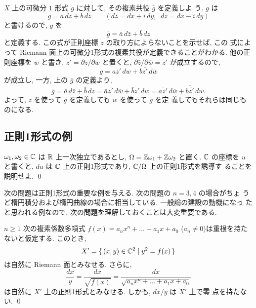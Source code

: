 \documentclass[12pt,twoside]{jarticle}
\def\zbar{{\bar z}}
\def\wbar{{\overline w}}
\def\Z{{\Bbb Z}} %
\def\R{{\Bbb R}} %
\def\C{{\Bbb C}} %
\begin{document}
$X$ 上の可微分 $1$ 形式 $g$ に対して, その複素共役 $\bar g$ を定義しよ
う. $g$ は
\[
  g = a\,dz + b\,d\zbar
  \qquad
  (dz=dx+i\,dy,\;\;d\zbar=dx-i\,dy)
\] %
と書けるので, $\overline{g}$ を %
\[
  \bar g = \bar a \,d\zbar + \bar b \,dz
\]
と定義する. この式が正則座標 $z$ の取り方によらないことを示せば, この
式によって Riemann 面上の可微分1形式の複素共役が定義できることがわかる.
他の正則座標を $w$ と書き, $z'=\partial z/\partial w$ と置くと, %
$\partial\zbar/\partial\wbar= \overline{z'}$ が成立するので, 
\[
  g = a z'\,dw + b \overline{z'}\,d\wbar
\]
が成立し, 一方, 上の $\bar g$ の定義より,
\[
  \bar g
  = \bar a \,d\zbar + \bar b \,dz
  = \bar a \overline{z'}\,d\wbar  + \bar b z'\,dw
  = \overline{az'}\,d\wbar  + \overline{b \overline{z'}}\,dw.
\]
よって, $z$ を使って $\bar g$ を定義しても $w$ を使って $\bar g$ を定
義してもそれらは同じものになる.


\subsection{正則1形式の例}

\begin{question}
  $\omega_1,\omega_2\in\C$ は $\R$ 上一次独立であるとし, %
  $\Omega=\Z\omega_1+\Z\omega_2$ と置く. $\C$ の座標を $u$ と書くと, %
  $du$ は $\C$ 上の正則1形式であり, $\C/\Omega$ 上の正則1形式を誘導す
  ることを説明せよ. \qed
\end{question}

次の問題は正則1形式の重要な例を与える. 次の問題の $n=3,4$ の場合がちょ
うど楕円積分および楕円曲線の場合に相当している. 一般論の建設の動機になっ
たと思われる例なので, 次の問題を理解しておくことは大変重要である.

\begin{question}\label{q:1form1}\qstar{*}
  $n\ge1$ 次の複素係数多項式 $f(x)=a_n x^n + \dots + a_1x+a_0$ %
  ($a_n\ne0$)は重根を持たないと仮定する. このとき,
  \[
    X' = \{\, (x,y)\in\C^2 \mid y^2 = f(x)\,\}
  \]
  は自然に Riemann 面とみなせる. さらに, 
  \[
    \frac{dx}{y}
    = \frac{dx}{\sqrt{f(x)}}
    = \frac{dx}{\sqrt{a_n x^n + \dots + a_1x+a_0}}
  \]
  は自然に $X'$ 上の正則1形式とみなせる. しかも, $dx/y$ は $X'$ 上で零
  点を持たない. \qed
\end{question}
\end{document}
